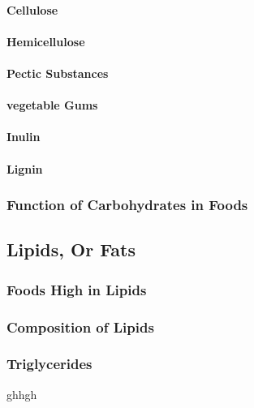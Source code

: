 



\paragraph*{Cellulose}
\paragraph*{Hemicellulose}
\paragraph*{Pectic Substances}
\paragraph*{vegetable Gums}
\paragraph*{Inulin}
\paragraph*{Lignin}

\subsubsection*{Function of Carbohydrates in Foods}

\subsection{Lipids, Or Fats}

\subsubsection*{Foods High in Lipids}

\subsubsection*{Composition of Lipids}

\subsubsection*{Triglycerides}
ghhgh

